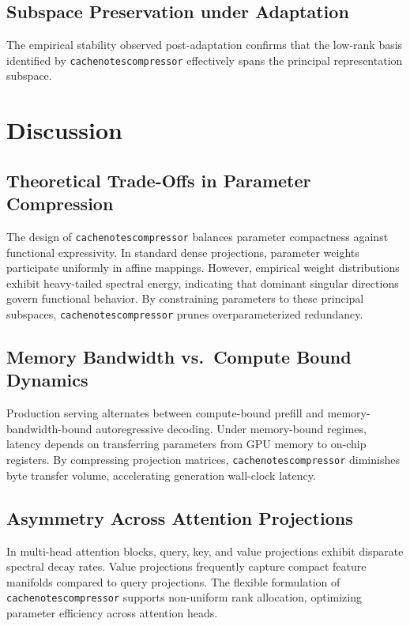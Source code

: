 \subsection{Subspace Preservation under Adaptation}
The empirical stability observed post-adaptation confirms that the low-rank basis identified by \texttt{cachenotescompressor} effectively spans the principal representation subspace.


\section{Discussion}

\subsection{Theoretical Trade-Offs in Parameter Compression}
The design of \texttt{cachenotescompressor} balances parameter compactness against functional expressivity. In standard dense projections, parameter weights participate uniformly in affine mappings. However, empirical weight distributions exhibit heavy-tailed spectral energy, indicating that dominant singular directions govern functional behavior. By constraining parameters to these principal subspaces, \texttt{cachenotescompressor} prunes overparameterized redundancy.

\subsection{Memory Bandwidth vs.\ Compute Bound Dynamics}
Production serving alternates between compute-bound prefill and memory-bandwidth-bound autoregressive decoding. Under memory-bound regimes, latency depends on transferring parameters from GPU memory to on-chip registers. By compressing projection matrices, \texttt{cachenotescompressor} diminishes byte transfer volume, accelerating generation wall-clock latency.

\subsection{Asymmetry Across Attention Projections}
In multi-head attention blocks, query, key, and value projections exhibit disparate spectral decay rates. Value projections frequently capture compact feature manifolds compared to query projections. The flexible formulation of \texttt{cachenotescompressor} supports non-uniform rank allocation, optimizing parameter efficiency across attention heads.

